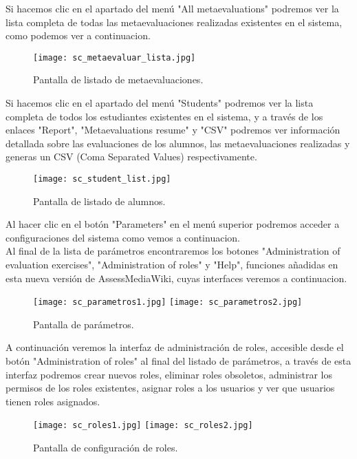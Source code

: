Si hacemos clic en el apartado del menú "All metaevaluations" podremos ver la lista completa de todas las metaevaluaciones realizadas existentes en el sistema, como podemos ver a continuacion.\\

\begin{figure}[h!]
	\centering
	\texttt{[image: sc\_metaevaluar\_lista.jpg]}
	\caption{Pantalla de listado de metaevaluaciones.}
\end{figure}
\clearpage

Si hacemos clic en el apartado del menú "Students" podremos ver la lista completa de todos los estudiantes existentes en el sistema, y a través de los enlaces "Report", "Metaevaluations resume" y "CSV" podremos ver información detallada sobre las evaluaciones de los alumnos, las metaevaluaciones realizadas y generas un CSV (Coma Separated Values) respectivamente.\\

\begin{figure}[h!]
	\centering
	\texttt{[image: sc\_student\_list.jpg]}
	\caption{Pantalla de listado de alumnos.}
\end{figure}
\clearpage

Al hacer clic en el botón "Parameters" en el menú superior podremos acceder a configuraciones del sistema como vemos a continuacion.\\

Al final de la lista de parámetros encontraremos los botones "Administration of evaluation exercises", "Administration of roles" y "Help", funciones añadidas en esta nueva versión de AssessMediaWiki, cuyas interfaces veremos a continuacion.

\begin{figure}[h!]
	\centering
	\texttt{[image: sc\_parametros1.jpg]}
	\texttt{[image: sc\_parametros2.jpg]}
	\caption{Pantalla de parámetros.}
\end{figure}
\clearpage

A continuación veremos la interfaz de administración de roles, accesible desde el botón "Administration of roles" al final del listado de parámetros, a través de esta interfaz podremos crear nuevos roles, eliminar roles obsoletos, administrar los permisos de los roles existentes, asignar roles a los usuarios y ver que usuarios tienen roles asignados.\\

\begin{figure}[h!]
	\centering
	\texttt{[image: sc\_roles1.jpg]}
	\texttt{[image: sc\_roles2.jpg]}
	\caption{Pantalla de configuración de roles.}
\end{figure}
\clearpage

